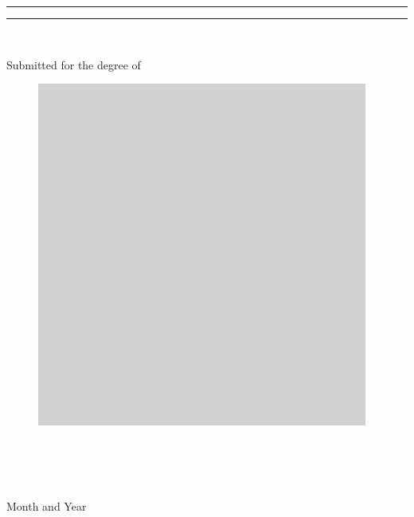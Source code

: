 \begin{titlepage}

\begin{center}
\rule{\linewidth}{1pt}

\textsc{\Large\thesistitle}

\rule{\linewidth}{1pt}

\vfill

\begin{Large}\textbf{\name}\end{Large} \\
[3ex]\begin{large}Submitted for the degree of \degree\end{large}

\vfill

\begin{figure}[h!]
 \centering
 \includegraphics[scale=0.4]{titlepage/logo_placeholder}
\end{figure}

\vfill
\begin{Large}\researchgroup\end{Large} \\
[2ex]\begin{Large}\department\end{Large} \\
[2ex]{\LARGE\university}\\
[5ex]{Month and Year}
\end{center}

\end{titlepage}

%
%
